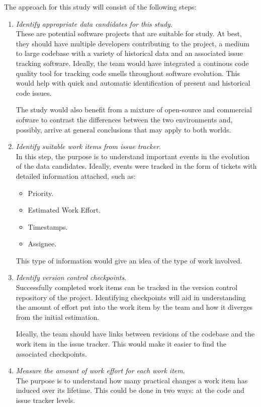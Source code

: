 \documentclass{mprop}
\begin{document}
The approach for this study will consist of the following steps:
\begin{enumerate}
	\item \textit{Identify appropriate data candidates for this study}.\\
	These are potential software projects that are suitable for study. At best,
	they should have multiple developers contributing to the project, a medium
	to large codebase with a variety of historical data and an associated issue
	tracking software. Ideally, the team would have integrated a continous code
	quality tool for tracking code smells throughout software evolution. This
	would help with quick and automatic identification of present and historical
	code issues. 
	
	The study would also benefit from a mixture of open-source and
	commercial sofware to contrast the differences between the two environments
	and, possibly, arrive at general conclusions that may apply to both worlds.

	\item \textit{Identify suitable work items from issue tracker}.\\
	In this step, the purpose is to understand important events in the evolution
	of the data candidates. Ideally, events were tracked in the form of tickets
	with detailed information attached, such as:
	\begin{itemize}
		\item Priority. 
		\item Estimated Work Effort.
		\item Timestamps.
		\item Assignee.  
	\end{itemize}

	This type of information would give an idea of the type of work involved.

	\item \textit{Identify version control checkpoints}.\\
	Successfully completed work items can be tracked in the version control
	repository of the project. Identifying checkpoints will aid in understanding
	the amount of effort put into the work item by the team and how it diverges
	from the initial estimation. 

	Ideally, the team should have links between revisions of the codebase and
	the work item in the issue tracker. This would make it easier to find the
	associated checkpoints.

	\item \textit{Measure the amount of work effort for each work item}.\\
	The purpose is to understand how many practical changes a work item has
	induced over its lifetime. This could be done in two ways: at the code and
	issue tracker levels.
	

\end{enumerate}
\end{document}

